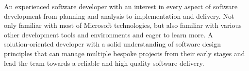 \begin{cvletter}



An experienced software developer with an interest in every aspect of software development from planning and analysis to implementation and delivery. Not only familiar with most of Microsoft technologies, but also familiar with various other development tools and environments and eager to learn more.
A solution‑oriented developer with a solid understanding of software design principles that can manage multiple bespoke projects from their early stages and lead the team towards a reliable and high quality software delivery.


\end{cvletter}